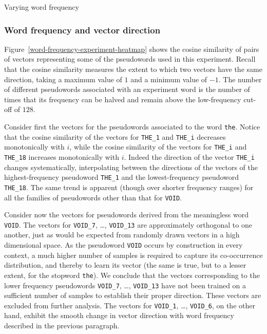 \documentclass{article} %
\newcommand{\word}[1]{\texttt{#1}}
\begin{document}
\begin{section}{Varying word frequency}
\subsubsection{Word frequency and vector direction}\label{WFVE-direction}
Figure~\ref{word-frequency-experiment-heatmap} shows the cosine
similarity of pairs of vectors representing some of the pseudowords used in
this experiment.  Recall that the cosine similarity measures the extent
to which two vectors have the same direction, taking a maximum value of
$1$ and a minimum value of $-1$.  The number of different pseudowords
associated with an experiment word is the number of times that its
frequency can be halved and remain above the low-frequency cut-off of
$128$.

Consider first the vectors for the pseudowords associated to the word
\word{the}.  Notice that the cosine similarity of the vectors for
\word{THE\_1} and \word{THE\_i} decreases monotonically with $i$, while the
cosine similarity of the vectors for \word{THE\_i} and \word{THE\_18}
increases monotonically with $i$.  Indeed the direction of
the vector \word{THE\_i} changes systematically, interpolating between the
directions of the vectors of the highest-frequency pseudoword
\word{THE\_1} and the lowest-frequency pseudoword \word{THE\_18}.  The same
trend is apparent (though over shorter frequency ranges) for all the families of pseudowords
other than that for \word{VOID}.

Consider now the vectors for pseudowords derived from the meaningless word
\word{VOID}.  The vectors for \word{VOID\_7}, \dots, \word{VOID\_13}
are approximately orthogonal to one another, just as would be expected from
randomly drawn vectors in a high dimensional space.
As the pseudoword \word{VOID} occurs by
construction in every context, a much higher number of samples is
required to capture its co-occurrence distribution, and
thereby to learn its vector (the same is true, but to a lesser
extent, for the stopword \word{the}).
We conclude that the vectors corresponding to the lower frequency
pseudowords \word{VOID\_7}, \dots, \word{VOID\_13} have not been trained on a
sufficient number of samples to establish their proper direction.
These vectors are excluded from further analysis.
The vectors for \word{VOID\_1}, \dots, \word{VOID\_6}, on the other hand,
exhibit the smooth change in vector direction with word frequency described in
the previous paragraph.


\end{section}
\end{document}
